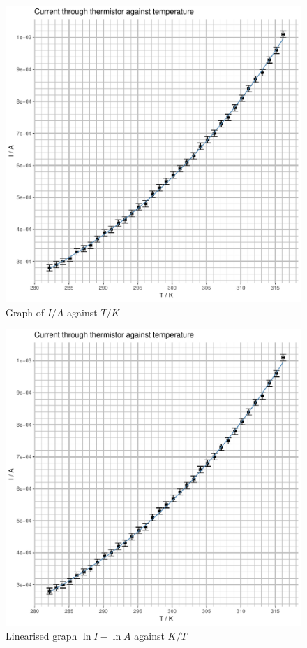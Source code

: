 \documentclass[a4paper,11pt]{article}
\begin{document}
\begin{figure}[H]
\includegraphics[width=\textwidth,page=1]{Rplots.pdf}
\caption{Graph of $I/A$ against $T/K$}
\label{fig:nonlinear}
\end{figure}

\begin{figure}[H]
\includegraphics[width=\textwidth,page=2]{Rplots.pdf}
\caption{Linearised graph $\ln{I} - \ln{A}$ against $K/T$}
\label{fig:linear}
\end{figure}
\end{document}

